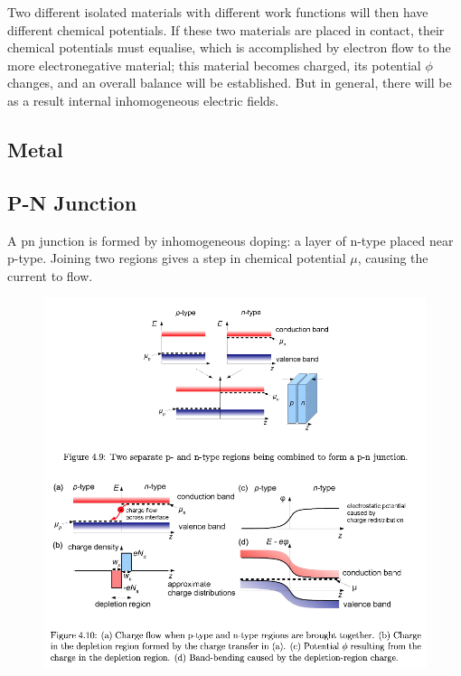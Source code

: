 \documentclass[12pt,a4paper]{article}
\begin{document}
Two different isolated materials with different work functions will then have different chemical potentials. If these two materials are placed in contact, their chemical potentials must equalise, which is accomplished by electron flow to the more electronegative material; this material becomes charged, its potential $\phi$ changes, and an overall balance will be established. But in general, there will be as a result internal inhomogeneous electric fields.

\subsection{Metal}

\subsection{P-N Junction}
A pn junction is formed by inhomogeneous doping: a layer of n-type placed near p-type.
Joining two regions gives a step in chemical potential $\mu$, causing the current to flow.
\begin{figure}[h]
    \includegraphics[clip=true,width=\columnwidth]{Images/PN_junction.png}
    \caption{}
\end{figure}
\end{document}
